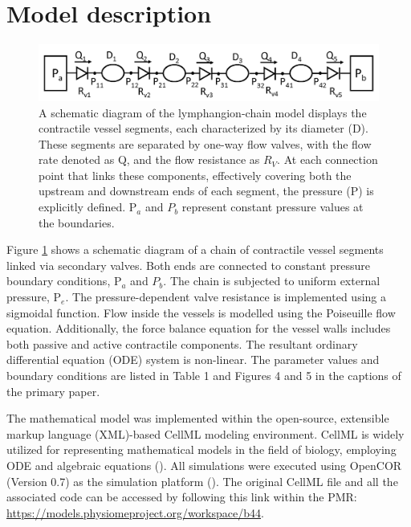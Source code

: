 \documentclass[fleqn,10pt]{physiome}
\begin{document}
\section{Model description}
\begin{figure}
    \centering
    \includegraphics[trim=3.10cm 7.0cm 0.10cm 7.0cm, clip=true, totalheight=0.2\textheight,  ]{Lymphangion_model.png}
    \caption{A schematic diagram of the lymphangion-chain model displays the contractile vessel segments, each characterized by its diameter (D). These segments are separated by one-way flow valves, with the flow rate denoted as Q, and the flow resistance as $R_{V}$. At each connection point that links these components, effectively covering both the upstream and downstream ends of each segment, the pressure (P) is explicitly defined. P$_{a}$ and $P_{b}$ represent constant pressure values at the boundaries. }
    \label{fig:schematic}
\end{figure}

Figure \ref{fig:schematic} shows a schematic diagram of a chain of contractile vessel segments linked via secondary valves. Both ends are connected to constant pressure boundary conditions, P$_{a}$ and $P_{b}$. The chain is subjected to uniform external pressure, P$_{e}$. The pressure-dependent valve resistance is implemented using a sigmoidal function. Flow inside the vessels is modelled using the Poiseuille flow equation. Additionally, the force balance equation for the vessel walls includes both passive and active contractile components. The resultant ordinary differential equation (ODE) system is non-linear. The parameter values and boundary conditions are listed in Table 1 and Figures 4 and 5 in the captions of the primary paper. 

The mathematical model was implemented within the open-source, extensible markup language (XML)-based CellML modeling environment. CellML is widely utilized for representing mathematical models in the field of biology, employing ODE and algebraic equations (\citealp{cuellar2003overview}). All simulations were executed using OpenCOR (Version 0.7) as the simulation platform (\citealp{garny2015opencor}). The original CellML file and all the associated code can be accessed by following this link within the PMR: \url{https://models.physiomeproject.org/workspace/b44}.
\end{document}
